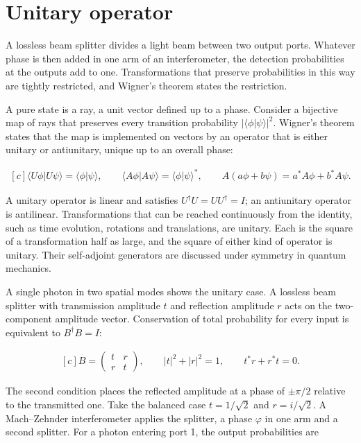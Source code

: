 \documentclass[11pt,oneside]{book}
\newenvironment{centeredalign}{\[\begin{gathered}[c]}{\end{gathered}\]}
\begin{document}
\clearpage

\section{Unitary operator}

\label{topic:unitary-operator}

A lossless beam splitter divides a light beam between two output ports. Whatever phase is then added in one arm of an interferometer, the detection probabilities at the outputs add to one. Transformations that preserve probabilities in this way are tightly restricted, and Wigner's theorem states the restriction.

A pure state is a ray, a unit vector defined up to a phase. Consider a bijective map of rays that preserves every transition probability \(|\langle\phi|\psi\rangle|^2\). Wigner's theorem states that the map is implemented on vectors by an operator that is either unitary or antiunitary, unique up to an overall phase:

\begin{centeredalign}
\langle U\phi|U\psi\rangle=\langle\phi|\psi\rangle,\qquad
\langle A\phi|A\psi\rangle=\langle\phi|\psi\rangle^*,\qquad
A(a\phi+b\psi)=a^*A\phi+b^*A\psi.
\end{centeredalign}

A unitary operator is linear and satisfies \(U^\dagger U=UU^\dagger=I\); an antiunitary operator is antilinear. Transformations that can be reached continuously from the identity, such as time evolution, rotations and translations, are unitary. Each is the square of a transformation half as large, and the square of either kind of operator is unitary. Their self-adjoint generators are discussed under symmetry in quantum mechanics.

A single photon in two spatial modes shows the unitary case. A lossless beam splitter with transmission amplitude \(t\) and reflection amplitude \(r\) acts on the two-component amplitude vector. Conservation of total probability for every input is equivalent to \(B^\dagger B=I\):

\begin{centeredalign}
B=\begin{pmatrix}t&r\\r&t\end{pmatrix},\qquad |t|^2+|r|^2=1,\qquad t^*r+r^*t=0.
\end{centeredalign}

The second condition places the reflected amplitude at a phase of \(\pm\pi/2\) relative to the transmitted one. Take the balanced case \(t=1/\sqrt2\) and \(r=i/\sqrt2\). A Mach--Zehnder interferometer applies the splitter, a phase \(\varphi\) in one arm and a second splitter. For a photon entering port 1, the output probabilities are
\end{document}
